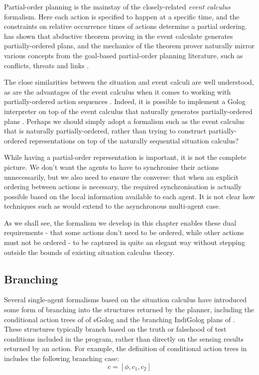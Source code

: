 Partial-order planning is the mainstay of the closely-related \emph{event
calculus} formalism. Here each action is specified to happen at a
specific time, and the constraints on relative occurrence times of
actions determine a partial ordering. \citet{Shanahan97ec_planning}
has shown that abductive theorem proving in the event calculate generates
partially-ordered plans, and the mechanics of the theorem prover naturally
mirror various concepts from the goal-based partial-order planning
literature, such as conflicts, threats and links \citep{peot92conditional_nonlinear}.

The close similarities between the situation and event calculi are
well understood, as are the advantages of the event calculus when
it comes to working with partially-ordered action sequences \citep{belleghem97sitcalc_evtcalc}.
Indeed, it is possible to implement a Golog interpreter on top of
the event calculus that naturally generates partially-ordered plans
\citep{pereira04ec_golog}. Perhaps we should simply adopt a formalism
such as the event calculus that is naturally partially-ordered, rather
than trying to construct partially-ordered representations on top
of the naturally sequential situation calculus?

While having a partial-order representation is important, it is not
the complete picture. We don't want the agents to have to synchronise
their actions unnecessarily, but we also need to ensure the converse:
that when an explicit ordering between actions is necessary, the required
synchronisation is actually possible based on the local information
available to each agent. It is not clear how techniques such as \citep{pereira04ec_golog}
would extend to the asynchronous multi-agent case.

As we shall see, the formalism we develop in this chapter enables
these dual requirements - that some actions don't need to be ordered,
while other actions must not be ordered - to be captured in quite
an elegant way without stepping outside the bounds of existing situation
calculus theory.


\subsection{Branching}

Several single-agent formalisms based on the situation calculus have
introduced some form of branching into the structures returned by
the planner, including the conditional action trees of of sGolog \citep{lakemeyer99golog_cats}
and the branching IndiGolog plans of \citep{giacomo04sem_delib_indigolog}.
These structures typically branch based on the truth or falsehood
of test conditions included in the program, rather than directly on
the sensing results returned by an action. For example, the definition
of conditional action trees in \citep{lakemeyer99golog_cats} includes
the following branching case:\[
c=[\phi,c_{1},c_{2}]\]


